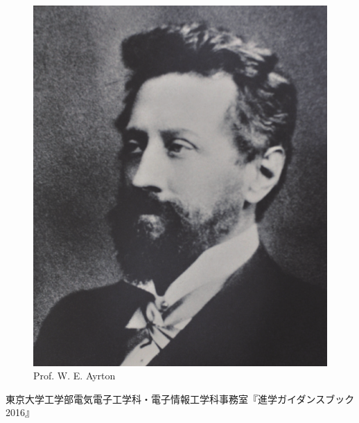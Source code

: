 \documentclass[uplatex,a4paper,dvipdfmx]{jsarticle} %
\begin{document}
\begin{figure}[htbp]
  \centering
  \includegraphics[height=45truemm]{ayrton.png}
  \caption{Prof. W. E. Ayrton}
  \label{fig:ayrton}
\end{figure}

\begin{thebibliography}{9}
 東京大学工学部電気電子工学科・電子情報工学科事務室『進学ガイダンスブック2016』
\end{thebibliography}
\end{document}
